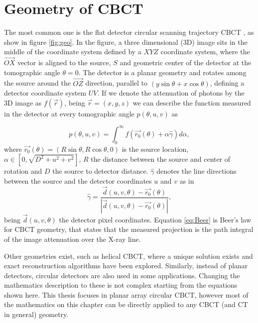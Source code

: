 \section{Geometry of CBCT}

The most common one is the flat detector circular scanning trajectory CBCT , as show in figure \ref{fig:geo}. In the figure, a three dimensional (3D) image sits in the middle  of the coordinate system defined by a $XYZ$ coordinate system, where the $\overrightarrow{OX}$ vector is aligned to the source, $S$ and geometric center of the detector at the tomographic angle $\theta=0$. The detector is a planar geometry and rotates among the source around the $\overrightarrow{OZ}$ direction, parallel to $(y \sin \theta+x\cos \theta)$, defining a detector coordinate system $UV$. If we denote the attenuation of photons by the 3D image as $ f(\vec r)$, being $\vec r =(x,y,z)$ we can describe the function measured in the detector at every tomographic angle $p(\theta,u,v)$ as 

\begin{equation}
p(\theta,u,v)= \int_{0}^{\infty} {f(\vec{r_0} (\theta)+\alpha\hat{\gamma})d\alpha},
\label{eq:Beer}
\end{equation} 
where $\vec{r_0} (\theta)=(R \sin\theta, R \cos \theta,0)$ is the source location, $\alpha \in [0,\sqrt{D^2+u^2+v^2}]$, $R$ the distance between the source and center of rotation and $D$ the source to detector distance. $\hat{\gamma}$ denotes the line directions between the source and the detector coordinates $u$ and $v$ as in
 \begin{equation}
\hat{\gamma}=\frac{\vec{d}(u,v,\theta) -\vec{r_0} (\theta) }{\left | \vec{d}(u,v,\theta) -\vec{r_0} (\theta)  \right |},
\end{equation}
being $\vec{d}(u,v,\theta)$ the detector pixel coordinates. Equation \ref{eq:Beer} is Beer's law for CBCT geometry, that states that the measured projection is the path integral of the image attenuation over the X-ray line. 

Other geometries exist, such as helical CBCT, where a unique solution exists and exact reconstruction algorithms have been explored. Similarly, instead of planar detectors, circular detectors are also used in some applications. Changing the mathematics description to these is not complex starting from the equations shown here. This thesis focuses in planar array circular CBCT, however most of the mathematics on this chapter can be directly applied to any CBCT (and CT in general) geometry.

